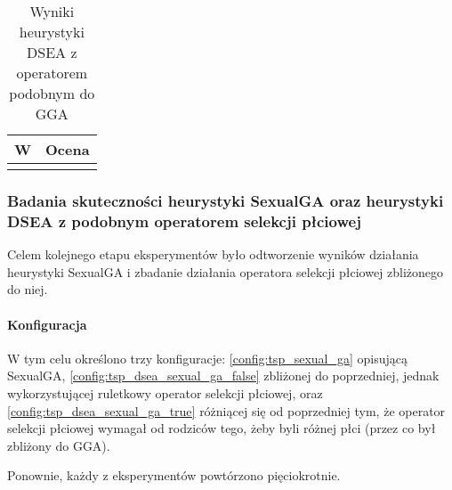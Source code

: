 \documentclass[./FM_mgr.tex]{subfiles}
\begin{document}
\begin{table}[h]
	\caption{Wyniki heurystyki DSEA z operatorem podobnym do GGA \label{table:tsp_dsea_gga}}
	\centering
	\begin{tabular}{|l|r@{$\pm$}l|}
		\hline
		\multicolumn{1}{|c|}{{\bf W}} & 
		\multicolumn{2}{c|}{{\bf Ocena}} \\ 
		\hline \hline
		\insertData{tsp_a}
	\end{tabular}
\end{table}

\subsubsection{Badania skuteczności heurystyki SexualGA oraz heurystyki DSEA z podobnym operatorem selekcji płciowej}

Celem kolejnego etapu eksperymentów było odtworzenie wyników działania heurystyki SexualGA i zbadanie działania operatora selekcji płciowej zbliżonego do niej.

\paragraph{Konfiguracja} W tym celu określono trzy konfiguracje: \ref{config:tsp_sexual_ga} opisującą SexualGA, \ref{config:tsp_dsea_sexual_ga_false} zbliżonej do poprzedniej, jednak wykorzystującej ruletkowy operator selekcji płciowej, oraz \ref{config:tsp_dsea_sexual_ga_true} różniącej się od poprzedniej tym, że operator selekcji płciowej wymagał od rodziców tego, żeby byli różnej płci (przez co był zbliżony do GGA).

Ponownie, każdy z eksperymentów powtórzono pięciokrotnie.
\end{document}
